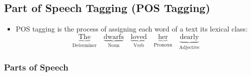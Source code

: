 		\subsection{Part of Speech Tagging (POS Tagging)} %
			\begin{itemize}
				\item POS tagging is the process of assigning each word of a text its lexical class:
					\begin{equation*}
						\underbrace{\text{The}}_\text{Determiner} \quad \underbrace{\text{dwarfs}}_\text{Noun} \quad \underbrace{\text{loved}}_\text{Verb} \quad \underbrace{\text{her}}_\text{Pronoun} \quad \underbrace{\text{dearly}}_\text{Adjective}
					\end{equation*}
			\end{itemize}

			\subsubsection{Parts of Speech} %
